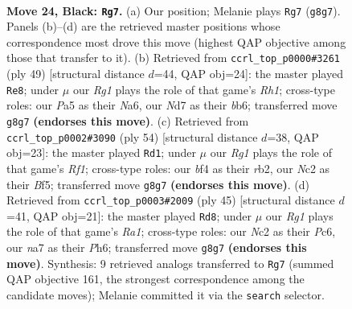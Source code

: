 \documentclass[11pt]{article}
\begin{document}
\clearpage

\begin{figure}[p]\centering
\begin{subfigure}{0.46\textwidth}\centering
\resizebox{\linewidth}{!}{%
\newchessgame
\chessboard[
  setfen={3k2r1/Nppnp2p/6p1/p7/5B1P/2P2P2/P1n1KP2/7R b - - 2 24},
  showmover=false,
  pgfstyle=straightmove, color=movearrow, markmove={g8-g7}
]}
\caption{}
\end{subfigure}\hfill
\begin{subfigure}{0.46\textwidth}\centering
\resizebox{\linewidth}{!}{%
\newchessgame
\chessboard[
  setfen={2k4r/1p4pp/nBp5/5p2/2P2Nn1/1P6/PK3P1P/3R4 b - - 1 25},
  showmover=false,
  pgfstyle=straightmove, color=movearrow, markmove={h8-e8}
]}
\caption{}
\end{subfigure}
\\[4pt]
\begin{subfigure}{0.46\textwidth}\centering
\resizebox{\linewidth}{!}{%
\newchessgame
\chessboard[
  setfen={6k1/p1p1b1p1/7p/n3PB1P/2pN4/P7/1r3PP1/5RK1 w - - 0 28},
  showmover=false,
  pgfstyle=straightmove, color=movearrow, markmove={f1-d1}
]}
\caption{}
\end{subfigure}\hfill
\begin{subfigure}{0.46\textwidth}\centering
\resizebox{\linewidth}{!}{%
\newchessgame
\chessboard[
  setfen={r5k1/p4pp1/2p1p2p/2p5/4P3/2B5/P1P1bPPP/R5K1 b - - 1 23},
  showmover=false,
  pgfstyle=straightmove, color=movearrow, markmove={a8-d8}
]}
\caption{}
\end{subfigure}
\caption{\textbf{Move 24, Black: \texttt{Rg7}.} (a) Our position; Melanie plays \texttt{Rg7} (\texttt{g8g7}). Panels (b)--(d) are the retrieved master positions whose correspondence most drove this move (highest QAP objective among those that transfer to it). (b) Retrieved from \texttt{ccrl\_top\_p0000\#3261} (ply 49) [structural distance $d$=44, QAP obj=24]: the master played \texttt{Re8}; under $\mu$ our \emph{Rg1} plays the role of that game's \emph{Rh1}; cross-type roles: our \emph{P}a5 as their \emph{N}a6, our \emph{N}d7 as their \emph{b}b6; transferred move \texttt{g8g7} \textbf{(endorses this move)}. (c) Retrieved from \texttt{ccrl\_top\_p0002\#3090} (ply 54) [structural distance $d$=38, QAP obj=23]: the master played \texttt{Rd1}; under $\mu$ our \emph{Rg1} plays the role of that game's \emph{Rf1}; cross-type roles: our \emph{b}f4 as their \emph{r}b2, our \emph{N}c2 as their \emph{B}f5; transferred move \texttt{g8g7} \textbf{(endorses this move)}. (d) Retrieved from \texttt{ccrl\_top\_p0003\#2009} (ply 45) [structural distance $d$=41, QAP obj=21]: the master played \texttt{Rd8}; under $\mu$ our \emph{Rg1} plays the role of that game's \emph{Ra1}; cross-type roles: our \emph{N}c2 as their \emph{P}c6, our \emph{n}a7 as their \emph{P}h6; transferred move \texttt{g8g7} \textbf{(endorses this move)}. Synthesis: 9 retrieved analogs transferred to \texttt{Rg7} (summed QAP objective 161, the strongest correspondence among the candidate moves); Melanie committed it via the \texttt{search} selector.}
\label{fig:thought-m47}
\end{figure}
\end{document}
